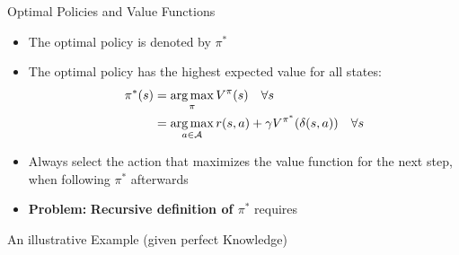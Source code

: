 \begin{frame}{Optimal Policies and Value Functions}{}
	\begin{itemize}
		\item The optimal policy is denoted by $\pi^*$
		\item The optimal policy has the highest expected value for all states:
		\begin{align*}
			\pi^*(s) 	&= \operatorname*{arg\,max}_{\pi} V^{\pi}(s) \quad \forall s \\
					&= \operatorname*{arg\,max}_{a \in \mathcal{A}} r(s, a) + \gamma V^{\pi^*}(\delta(s, a)) \quad \forall s
		\end{align*}
		\item Always select the action that maximizes the value function for the next step,
			when following $\pi^*$ afterwards
		\item \textbf{Problem:} \textbf{Recursive definition of $\pi^*$} requires 
	\end{itemize}
\end{frame}


\begin{frame}{An illustrative Example (given perfect Knowledge)}{}
\end{frame}


